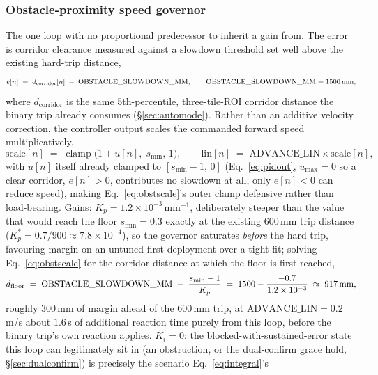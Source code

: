 \subsubsection{Obstacle-proximity speed governor}
\label{sec:obstacleloop}
The one loop with no proportional predecessor to inherit a gain from. The
error is corridor clearance measured against a slowdown threshold set well
above the existing hard-trip distance,
\begin{equation}
e[n] \;=\; d_{\text{corridor}}[n] \;-\; \text{OBSTACLE\_SLOWDOWN\_MM}, \qquad \text{OBSTACLE\_SLOWDOWN\_MM} = 1500\text{\,mm},
\label{eq:obsterror}
\end{equation}
where $d_{\text{corridor}}$ is the same 5th-percentile, three-tile-ROI
corridor distance the binary trip already consumes (\S\ref{sec:automode}).
Rather than an additive velocity correction, the controller output scales
the commanded forward speed multiplicatively,
\begin{equation}
\text{scale}[n] \;=\; \operatorname{clamp}\!\big(1 + u[n],\; s_{\min},\, 1\big), \qquad
\text{lin}[n] \;=\; \text{ADVANCE\_LIN} \times \text{scale}[n],
\label{eq:obstscale}
\end{equation}
with $u[n]$ itself already clamped to $[s_{\min}-1,\,0]$
(Eq.~\ref{eq:pidout}, $u_{\max}=0$ so a clear corridor, $e[n]>0$,
contributes no slowdown at all, only $e[n]<0$ can reduce speed), making
Eq.~\ref{eq:obstscale}'s outer clamp defensive rather than load-bearing.
Gains: $K_p = 1.2\times10^{-3}$\,mm$^{-1}$, deliberately steeper than the
value that would reach the floor $s_{\min}=0.3$ exactly at the existing
$600$\,mm trip distance ($K_p^{*} = 0.7/900 \approx 7.8\times10^{-4}$),
so the governor saturates \emph{before} the hard trip, favouring margin on
an untuned first deployment over a tight fit; solving
Eq.~\ref{eq:obstscale} for the corridor distance at which the floor is
first reached,
\begin{equation}
d_{\text{floor}} \;=\; \text{OBSTACLE\_SLOWDOWN\_MM} \;-\; \frac{s_{\min}-1}{K_p} \;=\; 1500 - \frac{-0.7}{1.2\times10^{-3}} \;\approx\; 917\text{\,mm},
\label{eq:obstfloor}
\end{equation}
roughly $300$\,mm of margin ahead of the $600$\,mm trip, at
$\text{ADVANCE\_LIN}=0.2$\,m/s about $1.6$\,s of additional reaction time
purely from this loop, before the binary trip's own reaction applies.
$K_i = 0$: the blocked-with-sustained-error state this loop can
legitimately sit in (an obstruction, or the dual-confirm grace hold,
\S\ref{sec:dualconfirm}) is precisely the scenario Eq.~\ref{eq:integral}'s
